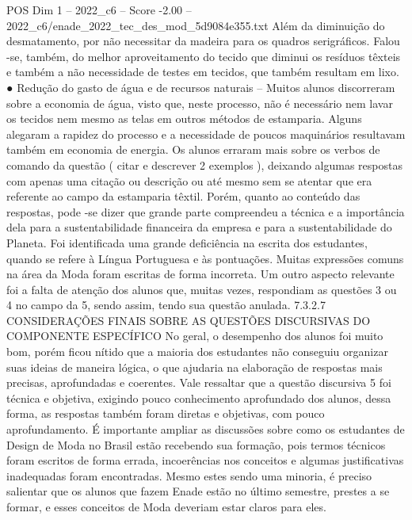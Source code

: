 \begin{textsample}{POS Dim 1 – 2022\_c6 – Score -2.00 – 2022\_c6/enade\_2022\_tec\_des\_mod\_5d9084e355.txt}
Além da diminuição do desmatamento, por não necessitar da madeira para os quadros serigráficos.
Falou -se, também, do melhor aproveitamento do tecido que diminui os resíduos têxteis e também a não necessidade de testes em tecidos, que também resultam em lixo. {\EmojiFont ●} Redução do gasto de água e de recursos naturais – Muitos alunos discorreram sobre a economia de água, visto que, neste processo, não é necessário nem lavar os tecidos nem mesmo as telas em outros métodos de estamparia.
Alguns alegaram a rapidez do processo e a necessidade de poucos maquinários resultavam também em economia de energia.
Os alunos erraram mais sobre os verbos de comando da questão ( citar e descrever 2 exemplos ), deixando algumas respostas com apenas uma citação ou descrição ou até mesmo sem se atentar que era referente ao campo da estamparia têxtil.
Porém, quanto ao conteúdo das respostas, pode -se dizer que grande parte compreendeu a técnica e a importância dela para a sustentabilidade financeira da empresa e para a sustentabilidade do Planeta.
Foi identificada uma grande deficiência na escrita dos estudantes, quando se refere à Língua Portuguesa e às pontuações.
Muitas expressões comuns na área da Moda foram escritas de forma incorreta.
Um outro aspecto relevante foi a falta de atenção dos alunos que, muitas vezes, respondiam as questões 3 ou 4 no campo da 5, sendo assim, tendo sua questão anulada. 7.3.2.7 CONSIDERAÇÕES FINAIS SOBRE AS QUESTÕES DISCURSIVAS DO COMPONENTE ESPECÍFICO No geral, o desempenho dos alunos foi muito bom, porém ficou nítido que a maioria dos estudantes não conseguiu organizar suas ideias de maneira lógica, o que ajudaria na elaboração de respostas mais precisas, aprofundadas e coerentes.
Vale ressaltar que a questão discursiva 5 foi técnica e objetiva, exigindo pouco conhecimento aprofundado dos alunos, dessa forma, as respostas também foram diretas e objetivas, com pouco aprofundamento.
É importante ampliar as discussões sobre como os estudantes de Design de Moda no Brasil estão recebendo sua formação, pois termos técnicos foram escritos de forma errada, incoerências nos conceitos e algumas justificativas inadequadas foram encontradas.
Mesmo estes sendo uma minoria, é preciso salientar que os alunos que fazem Enade estão no último semestre, prestes a se formar, e esses conceitos de Moda deveriam estar claros para eles.

\end{textsample}
